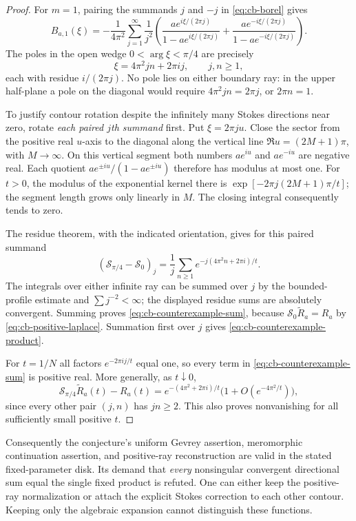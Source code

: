 \begin{proof}
For $m=1$, pairing the summands $j$ and $-j$ in
\eqref{eq:cb-borel} gives
\begin{equation}
 B_{a,1}(\xi)=-\frac{1}{4\pi^2}
  \sum_{j=1}^{\infty}\frac{1}{j^2}
  \left(
   \frac{ae^{i\xi/(2\pi j)}}{1-ae^{i\xi/(2\pi j)}}
   +\frac{ae^{-i\xi/(2\pi j)}}{1-ae^{-i\xi/(2\pi j)}}
  \right).
 \label{eq:cb-mone-borel}
\end{equation}
The poles in the open wedge $0<\arg\xi<\pi/4$ are precisely
\[
 \xi=4\pi^2jn+2\pi i j,\qquad j,n\geq1,
\]
each with residue $i/(2\pi j)$.  No pole lies on either boundary ray:
in the upper half-plane a pole on the diagonal would require
$4\pi^2jn=2\pi j$, or $2\pi n=1$.

To justify contour rotation despite the infinitely many Stokes directions
near zero, rotate \emph{each paired $j$th summand} first.  Put
$\xi=2\pi j u$.  Close the sector from the positive real $u$-axis to
the diagonal along the vertical line
$\Re u=(2M+1)\pi$, with $M\to\infty$.  On this vertical segment both
numbers $ae^{iu}$ and $ae^{-iu}$ are negative real.  Each quotient
$ae^{\pm iu}/(1-ae^{\pm iu})$ therefore has modulus at most one.
For $t>0$, the modulus of the exponential kernel there is
$\exp[-2\pi j(2M+1)\pi/t]$; the segment length grows only linearly in
$M$.  The closing integral consequently tends to zero.

The residue theorem, with the indicated orientation, gives for this
paired summand
\[
 (\mathcal S_{\pi/4}-\mathcal S_0)_j
 =\frac{1}{j}\sum_{n\geq1}
          e^{-j(4\pi^2n+2\pi i)/t}.
\]
The integrals over either infinite ray can be summed over $j$ by the
bounded-profile estimate and $\sum j^{-2}<\infty$; the displayed
residue sums are absolutely convergent.  Summing proves
\eqref{eq:cb-counterexample-sum}, because
$\mathcal S_0\widetilde R_a=R_a$ by
\eqref{eq:cb-positive-laplace}.  Summation first over $j$ gives
\eqref{eq:cb-counterexample-product}.

For $t=1/N$ all factors $e^{-2\pi i j/t}$ equal one, so every term in
\eqref{eq:cb-counterexample-sum} is positive real.  More generally, as
$t\downarrow0$,
\[
 \mathcal S_{\pi/4}\widetilde R_a(t)-R_a(t)
 =e^{-(4\pi^2+2\pi i)/t}
       \bigl(1+O(e^{-4\pi^2/t})\bigr),
\]
since every other pair $(j,n)$ has $jn\geq2$.  This also proves
nonvanishing for all sufficiently small positive $t$.
\end{proof}

Consequently the conjecture's uniform Gevrey assertion, meromorphic
continuation assertion, and positive-ray reconstruction are valid in
the stated fixed-parameter disk.  Its demand that \emph{every}
nonsingular convergent directional sum equal the single fixed product
is refuted.  One can either keep the positive-ray normalization or attach
the explicit Stokes correction to each other contour.  Keeping only the
algebraic expansion cannot distinguish these functions.

